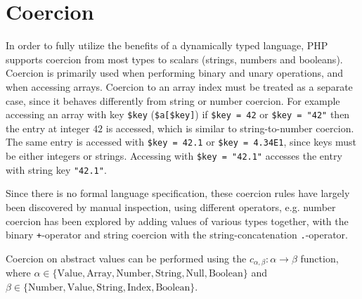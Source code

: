 \section{Coercion}
\label{sec:coercion}

In order to fully utilize the benefits of a dynamically typed language, PHP supports coercion from most types to scalars (strings, numbers and booleans). Coercion is primarily used when performing binary and unary operations, and when accessing arrays. Coercion to an array index must be treated as a separate case, since it behaves differently from string or number coercion. For example accessing an array with key \texttt{\$key} (\texttt{\$a[\$key]}) if \texttt{\$key = 42} or \texttt{\$key = "42"} then the entry at integer $42$ is accessed, which is similar to string-to-number coercion. The same entry is accessed with \texttt{\$key = 42.1} or \texttt{\$key = 4.34E1}, since keys must be either integers or strings. Accessing with \texttt{\$key = "42.1"} accesses the entry with string key \texttt{"42.1"}. 

Since there is no formal language specification, these coercion rules have largely been discovered by manual inspection, using different operators, e.g. number coercion has been explored by adding values of various types together, with the binary \texttt{+}-operator and string coercion with the string-concatenation \texttt{.}-operator.

Coercion on abstract values can be performed using the $c_{\alpha, \beta} : \alpha \rightarrow \beta$ function, where $\alpha \in \{ \text{Value}, \text{Array}, \text{Number}, \text{String}, \text{Null}, \text{Boolean}\}$ and $\beta \in \{\text{Number}, \text{Value}, \text{String}, \text{Index}, \text{Boolean}\}$. 

